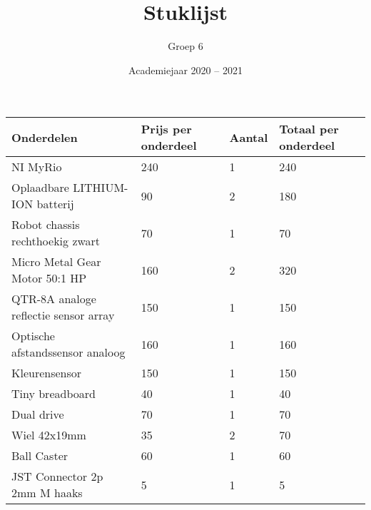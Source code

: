 \documentclass[a4paper,kulak]{kulakarticle} %
\date{Academiejaar 2020 -- 2021}
\title{Stuklijst}
\author{Groep 6}
\begin{document}
\maketitle

\begin{center}
	
	\begin{tabular}{|l|l|l|l|}
		\hline
		\textbf{Onderdelen}                   & \textbf{Prijs per onderdeel} & \textbf{Aantal} & \textbf{Totaal per onderdeel} \\ \hline
		NI MyRio                              & 240                          & 1               & 240                           \\ \hline
		Oplaadbare LITHIUM-ION batterij       & 90                           & 2               & 180                           \\ \hline
		Robot chassis rechthoekig zwart       & 70                           & 1               & 70                            \\ \hline
		Micro Metal Gear Motor 50:1 HP        & 160                          & 2               & 320                           \\ \hline
		QTR-8A analoge reflectie sensor array & 150                          & 1               & 150                           \\ \hline
		Optische afstandssensor analoog       & 160                          & 1               & 160                           \\ \hline
		Kleurensensor                         & 150                          & 1               & 150                           \\ \hline
		Tiny breadboard                       & 40                           & 1               & 40                            \\ \hline
		Dual drive                            & 70                           & 1               & 70                            \\ \hline
		Wiel 42x19mm                          & 35                           & 2               & 70                            \\ \hline
		Ball Caster                           & 60                           & 1               & 60                            \\ \hline
		JST Connector 2p 2mm M haaks          & 5                            & 1               & 5                             \\ \hline

\end{tabular}
\end{center}
\end{document}
